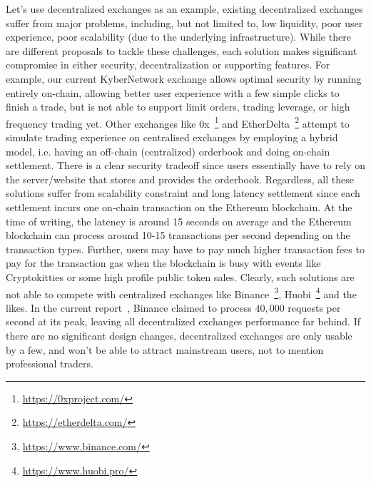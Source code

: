 Let's use decentralized exchanges as an example, existing decentralized exchanges suffer from major problems, including, but not limited to, low liquidity, poor user experience, poor scalability (due to the underlying infrastructure). While there are different proposals to tackle these challenges, each solution makes significant compromise in either security, decentralization or supporting features. For example, our current KyberNetwork exchange allows optimal security by running entirely on-chain, allowing better user experience with a few simple clicks to finish a trade, but is not able to support limit orders, trading leverage, or high frequency trading yet. Other exchanges like 0x~\footnote{\url{https://0xproject.com/}} and EtherDelta~\footnote{\url{https://etherdelta.com/}} attempt to simulate trading experience on centralised exchanges by employing a hybrid model, i.e. having an off-chain (centralized) orderbook and doing on-chain settlement. There is a clear security tradeoff since users essentially have to rely on the server/website that stores and provides the orderbook. Regardless, all these solutions suffer from scalability constraint and long latency settlement since each settlement incurs one on-chain transaction on the Ethereum blockchain. At the time of writing, the latency is around 15 seconds on average and the Ethereum blockchain can process around 10-15 transactions per second depending on the transaction types. Further, users may have to pay much higher transaction fees to pay for the transaction gas when the blockchain is busy with events like Cryptokitties or some high profile public token sales. Clearly, such solutions are not able to compete with centralized exchanges like Binance~\footnote{\url{https://www.binance.com/}}, Huobi~\footnote{\url{https://www.huobi.pro/}} and the likes. In the current report~\cite{binance-report}, Binance claimed to process $40,000$ requests per second at its peak, leaving all decentralized exchanges performance far behind. If there are no significant design changes, decentralized exchanges are only usable by a few, and won't be able to attract mainstream users, not to mention professional traders.

